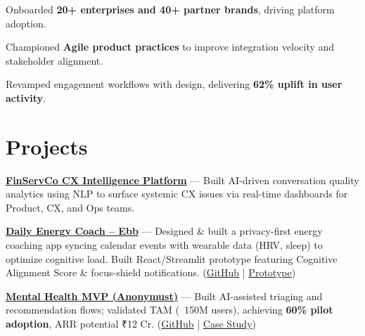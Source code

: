 \documentclass[]{plushcv}
\begin{document}
\begin{minipage}[t]{0.70\textwidth}
\sectionsep


\begin{tightemize}
\item Onboarded \textbf{20+ enterprises and 40+ partner brands}, driving platform adoption.
\item Championed \textbf{Agile product practices} to improve integration velocity and stakeholder alignment.
\item Revamped engagement workflows with design, delivering \textbf{62\% uplift in user activity}.
\end{tightemize}


\section{Projects}
\medskip

\begin{tightemize}
\item \href{https://assets.nextleap.app/submissions/FinServeCo-AIQualityFramework-6213c503-399a-4940-abca-6b18290d237e.pdf}{\textbf{FinServCo CX Intelligence Platform}} — Built AI-driven conversation quality analytics using NLP to surface systemic CX issues via real-time dashboards for Product, CX, and Ops teams.
\item \href{https://daily-energy-coach.streamlit.app/}{\textbf{Daily Energy Coach – Ebb}} — Designed & built a privacy-first energy coaching app syncing calendar events with wearable data (HRV, sleep) to optimize cognitive load. Built React/Streamlit prototype featuring Cognitive Alignment Score & focus-shield notifications. (\href{https://github.com/bhavyaamahajann/Daily_Energy_Coach}{GitHub} | \href{https://daily-energy-coach.streamlit.app/}{Prototype})
\item \href{https://github.com/bhavyaamahajann/Anonymust}{\textbf{Mental Health MVP (Anonymust)}} — Built AI-assisted triaging and recommendation flows; validated TAM (~150M users), achieving \textbf{60\% pilot adoption}, ARR potential ₹12 Cr. (\href{https://github.com/bhavyaamahajann/Anonymust}{GitHub} | \href{https://assets.nextleap.app/submissions/NLAnonyMust-a4105408-3124-4fb0-8b41-58fd4bf97299.pdf}{Case Study})
\end{tightemize}

\end{minipage}
\end{document}
